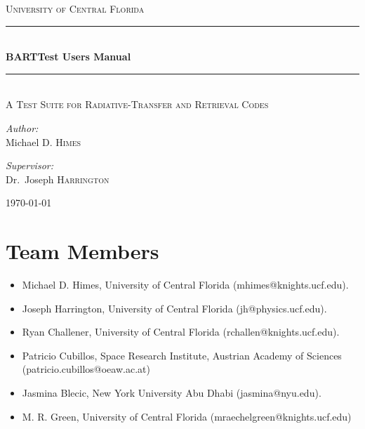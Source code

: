 \documentclass[letterpaper, 12pt]{article}
\begin{document}
\begin{titlepage}
\begin{center}

\textsc{\LARGE University of Central Florida}\\[1.5cm]

\rule{\linewidth}{0.5mm} \\[0.4cm]
{ \huge \bfseries BARTTest Users Manual \\[0.4cm] }
\rule{\linewidth}{0.5mm} \\[1.0cm]

\textsc{\Large A Test Suite for Radiative-Transfer and Retrieval Codes}\\[1.5cm]

\noindent
\begin{minipage}{0.4\textwidth}
\begin{flushleft} \large
\emph{Author:}\\
Michael D. \textsc{Himes}\\
\end{flushleft}
\end{minipage}%
\begin{minipage}{0.4\textwidth}
\begin{flushright} \large
\emph{Supervisor:} \\
Dr.~Joseph \textsc{Harrington}
\end{flushright}
\end{minipage}

\vfill

{\large \today}

\end{center}
\end{titlepage}

\tableofcontents

\newpage

\section{Team Members}
\label{sec:team}

\begin{itemize}
\item Michael D. Himes, University of Central Florida (mhimes@knights.ucf.edu).
\item Joseph Harrington, University of Central Florida (jh@physics.ucf.edu).
\item Ryan Challener, University of Central Florida (rchallen@knights.ucf.edu).
\item Patricio Cubillos, Space Research Institute, Austrian Academy of Sciences (patricio.cubillos@oeaw.ac.at)
\item Jasmina Blecic, New York University Abu Dhabi (jasmina@nyu.edu).
\item M. R. Green, University of Central Florida (mraechelgreen@knights.ucf.edu)
\end{itemize}
\end{document}
